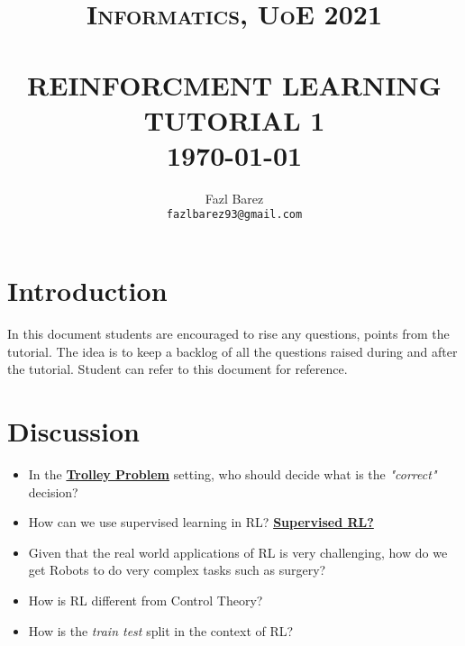 \documentclass[paper=a4, fontsize=11pt,twoside]{scrartcl}	%
\title{	\normalsize \textsc{Informatics, UoE 2021} 	%
		 	\\[2.0cm]								%
			\HRule{0.5pt} \\						%
			\LARGE \textbf{\uppercase{Reinforcment Learning Tutorial 1}}	%
			\HRule{2pt} \\ [0.5cm]		%
			\normalsize \today			%
		}
\author{
		Fazl Barez\\	
        \texttt{fazlbarez93@gmail.com} \\
}
\makeatletter
\def\printtitle{%
    {\centering \@title\par}}
\def\printauthor{%
    {\centering \large \@author}}
\makeatother
\begin{document}
\thispagestyle{empty}		%

\printtitle					%
  	\vfill
\printauthor				%
\newpage
\setcounter{page}{1}		%
\section*{Introduction}

In this document students are encouraged to rise any questions, points from the tutorial. 
The idea is to keep a backlog of all the questions raised during and after the tutorial. Student can refer to this document for reference. 

\section*{Discussion}

\begin{itemize}
    \item {In the \href{https://en.wikipedia.org/wiki/Trolley_problem}{\textbf{Trolley Problem}} setting, who should decide what is the \textit{"correct"} decision?}
    \item {How can we use supervised learning in RL? \href{https://bair.berkeley.edu/blog/2020/10/13/supervised-rl/}{\textbf{Supervised RL?}}}
    \item{Given that the real world applications of RL is very challenging, how do we get Robots to do very complex tasks such as surgery?}
    \item How is RL different from Control Theory?
    \item {How is the \textit{train test} split in the context of RL?}
\end{itemize}
\end{document}
